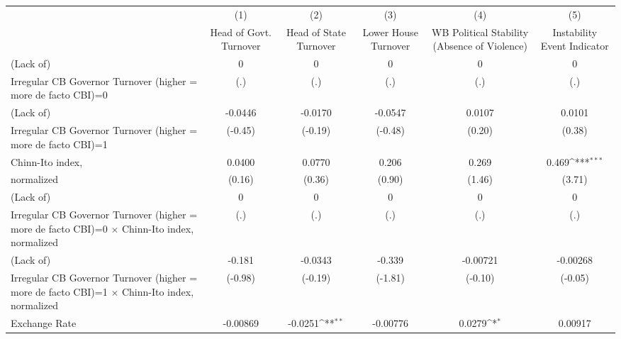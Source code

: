{
\def\sym#1{\ifmmode^{#1}\else\(^{#1}\)\fi}
\begin{tabular}{l*{5}{c}}
\toprule
                &\multicolumn{1}{c}{(1)}&\multicolumn{1}{c}{(2)}&\multicolumn{1}{c}{(3)}&\multicolumn{1}{c}{(4)}&\multicolumn{1}{c}{(5)}\\
                &\multicolumn{1}{c}{Head of Govt. Turnover}&\multicolumn{1}{c}{Head of State Turnover}&\multicolumn{1}{c}{Lower House Turnover}&\multicolumn{1}{c}{WB Political Stability (Absence of Violence)}&\multicolumn{1}{c}{Instability Event Indicator}\\
\midrule
(Lack of)       &        0         &        0         &        0         &        0         &        0         \\
Irregular CB Governor Turnover (higher = more de facto CBI)=0&      (.)         &      (.)         &      (.)         &      (.)         &      (.)         \\
\addlinespace
(Lack of)       &  -0.0446         &  -0.0170         &  -0.0547         &   0.0107         &   0.0101         \\
Irregular CB Governor Turnover (higher = more de facto CBI)=1&  (-0.45)         &  (-0.19)         &  (-0.48)         &   (0.20)         &   (0.38)         \\
\addlinespace
Chinn-Ito index,&   0.0400         &   0.0770         &    0.206         &    0.269         &    0.469\sym{***}\\
normalized      &   (0.16)         &   (0.36)         &   (0.90)         &   (1.46)         &   (3.71)         \\
\addlinespace
(Lack of)       &        0         &        0         &        0         &        0         &        0         \\
Irregular CB Governor Turnover (higher = more de facto CBI)=0 $\times$ Chinn-Ito index, normalized&      (.)         &      (.)         &      (.)         &      (.)         &      (.)         \\
\addlinespace
(Lack of)       &   -0.181         &  -0.0343         &   -0.339         & -0.00721         & -0.00268         \\
Irregular CB Governor Turnover (higher = more de facto CBI)=1 $\times$ Chinn-Ito index, normalized&  (-0.98)         &  (-0.19)         &  (-1.81)         &  (-0.10)         &  (-0.05)         \\
\addlinespace
Exchange Rate   & -0.00869         &  -0.0251\sym{**} & -0.00776         &   0.0279\sym{*}  &  0.00917         \\

\end{tabular}}
